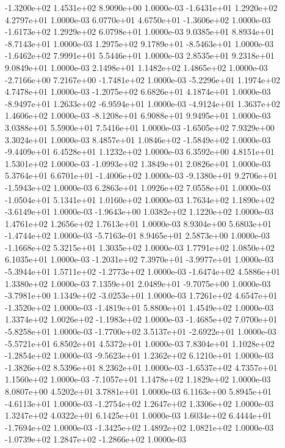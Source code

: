 -1.3200e+02  1.4531e+02  8.9090e+00  1.0000e-03
-1.6431e+01  1.2920e+02  4.2797e+01  1.0000e-03
 6.0770e+01  4.6750e+01 -1.3606e+02  1.0000e-03
-1.6173e+02  1.2929e+02  6.0798e+01  1.0000e-03
 9.0385e+01  8.8934e+01 -8.7143e+01  1.0000e-03
 1.2975e+02  9.1789e+01 -8.5463e+01  1.0000e-03
-1.6462e+02  7.9991e+01  5.5446e+01  1.0000e-03
2.8535e+01 9.2318e+01 9.0849e+01  1.0000e-03
2.1498e+01 1.1482e+02 1.4865e+02  1.0000e-03
-2.7166e+00  7.2167e+00 -1.7481e+02  1.0000e-03
-5.2296e+01  1.1974e+02  4.7478e+01  1.0000e-03
-1.2075e+02  6.6826e+01  4.1874e+01  1.0000e-03
-8.9497e+01  1.2633e+02 -6.9594e+01  1.0000e-03
-4.9124e+01  1.3637e+02  1.4606e+02  1.0000e-03
-8.1208e+01  6.9088e+01  9.9495e+01  1.0000e-03
3.0388e+01 5.5900e+01 7.5416e+01  1.0000e-03
-1.6505e+02  7.9329e+00  3.3024e+01  1.0000e-03
 8.4857e+01  1.0846e+02 -1.5849e+02  1.0000e-03
-9.4409e+01  6.4528e+01  1.1232e+02  1.0000e-03
6.3592e+00 4.8151e+01 1.5301e+02  1.0000e-03
-1.0993e+02  1.3849e+01  2.0826e+01  1.0000e-03
 5.3764e+01  6.6701e+01 -1.4006e+02  1.0000e-03
-9.1380e+01  9.2706e+01 -1.5943e+02  1.0000e-03
6.2863e+01 1.0926e+02 7.0558e+01  1.0000e-03
-1.0504e+01  5.1341e+01  1.0160e+02  1.0000e-03
 1.7634e+02  1.1890e+02 -3.6149e+01  1.0000e-03
-1.9643e+00  1.0382e+02  1.1220e+02  1.0000e-03
1.4761e+02 1.2656e+02 1.7613e+01  1.0000e-03
 8.9304e+00  5.6803e+01 -1.4744e+02  1.0000e-03
-5.7163e-01  8.9465e+01  2.5873e+00  1.0000e-03
-1.1668e+02  5.3215e+01  1.3035e+02  1.0000e-03
1.7791e+02 1.0850e+02 6.1035e+01  1.0000e-03
-1.2031e+02  7.3970e+01 -3.9977e+01  1.0000e-03
-5.3944e+01  1.5711e+02 -1.2773e+02  1.0000e-03
-1.6474e+02  4.5886e+01  1.3380e+02  1.0000e-03
 7.1359e+01  2.0489e+01 -9.7075e+00  1.0000e-03
-3.7981e+00  1.1349e+02 -3.0253e+01  1.0000e-03
 1.7261e+02  4.6547e+01 -1.3520e+02  1.0000e-03
-1.4819e+01  5.8800e+01  1.4549e+02  1.0000e-03
 1.3374e+02  1.0026e+02 -1.1983e+02  1.0000e-03
-1.4685e+02  7.0700e+01 -5.8258e+01  1.0000e-03
-1.7700e+02  3.5137e+01 -2.6922e+01  1.0000e-03
-5.5721e+01  6.8502e+01  4.5372e+01  1.0000e-03
 7.8304e+01  1.1028e+02 -1.2854e+02  1.0000e-03
-9.5623e+01  1.2362e+02  6.1210e+01  1.0000e-03
-1.3826e+02  8.5396e+01  8.2362e+01  1.0000e-03
-1.6537e+02  4.7357e+01  1.1560e+02  1.0000e-03
-7.1057e+01  1.1478e+02  1.1829e+02  1.0000e-03
8.0807e+00 4.5202e+01 3.7881e+01  1.0000e-03
 6.1163e+00  5.8945e+01 -4.6113e+01  1.0000e-03
-1.2754e+02  1.2647e+02  1.3306e+02  1.0000e-03
1.3247e+02 4.0322e+01 6.1425e+01  1.0000e-03
 1.6034e+02  6.4444e+01 -1.7694e+02  1.0000e-03
-1.3425e+02  1.4892e+02  1.0821e+02  1.0000e-03
-1.0739e+02  1.2847e+02 -1.2866e+02  1.0000e-03
